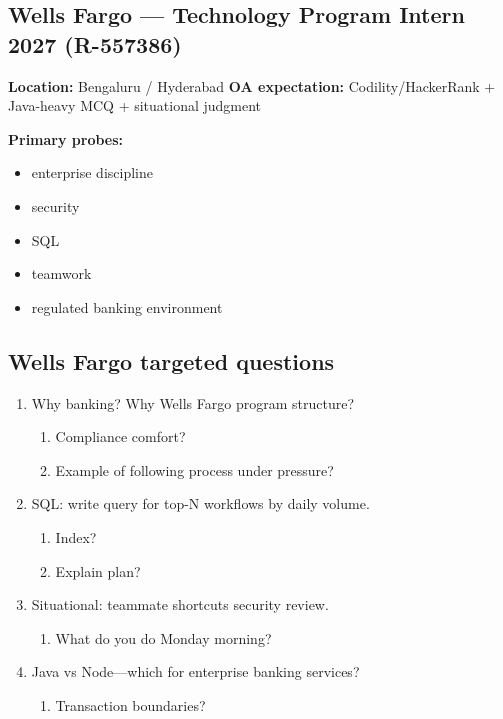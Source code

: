 \documentclass[9pt,a4paper]{article}
\begin{document}
\subsection{Wells Fargo --- Technology Program Intern 2027 (R-557386)}
\textbf{Location:} Bengaluru / Hyderabad \quad \textbf{OA expectation:} Codility/HackerRank + Java-heavy MCQ + situational judgment

\textbf{Primary probes:}
\begin{itemize}
  \item enterprise discipline
  \item security
  \item SQL
  \item teamwork
  \item regulated banking environment
\end{itemize}

\subsection{Wells Fargo targeted questions}
\begin{enumerate}[label=\textbf{Q\arabic*:}, leftmargin=*]
  \item Why banking? Why Wells Fargo program structure?
  \begin{enumerate}[label=\textit{FU\arabic*:}, leftmargin=2em]
    \item Compliance comfort?
    \item Example of following process under pressure?
  \end{enumerate}
  \item SQL: write query for top-N workflows by daily volume.
  \begin{enumerate}[label=\textit{FU\arabic*:}, leftmargin=2em]
    \item Index?
    \item Explain plan?
  \end{enumerate}
  \item Situational: teammate shortcuts security review.
  \begin{enumerate}[label=\textit{FU\arabic*:}, leftmargin=2em]
    \item What do you do Monday morning?
  \end{enumerate}
  \item Java vs Node---which for enterprise banking services?
  \begin{enumerate}[label=\textit{FU\arabic*:}, leftmargin=2em]
    \item Transaction boundaries?
  \end{enumerate}
\end{enumerate}
\end{document}
